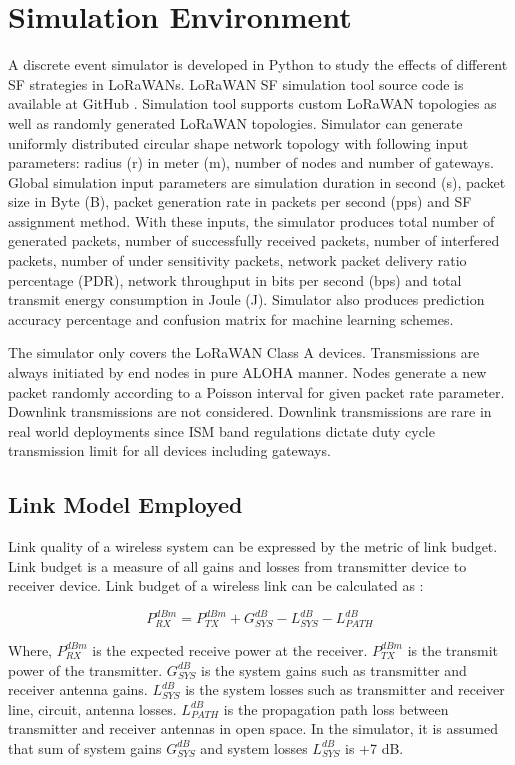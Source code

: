 \documentclass[conference]{IEEEtran}
\begin{document}
\section{Simulation Environment} \label{Simulation Environment}
A discrete event simulator is developed in Python to study the effects of different SF strategies in LoRaWANs. LoRaWAN SF simulation tool source code is available at GitHub \cite{simlorasf}. Simulation tool supports custom LoRaWAN topologies as well as randomly generated LoRaWAN topologies. Simulator can generate uniformly distributed circular shape network topology with following input parameters: radius (r) in meter (m), number of nodes and number of gateways. Global simulation input parameters are simulation duration in second (s), packet size in Byte (B), packet generation rate in packets per second (pps) and SF assignment method. With these inputs, the simulator produces total number of generated packets, number of successfully received packets, number of interfered packets, number of under sensitivity packets, network packet delivery ratio percentage (PDR), network throughput in bits per second (bps) and total transmit energy consumption in Joule (J). Simulator also produces prediction accuracy percentage and confusion matrix for machine learning schemes.

The simulator only covers the LoRaWAN Class A devices. Transmissions are always initiated by end nodes in pure ALOHA manner. Nodes generate a new packet randomly according to a Poisson interval for given packet rate parameter. Downlink transmissions are not considered. Downlink transmissions are rare in real world deployments since ISM band regulations dictate duty cycle transmission limit for all devices including gateways.

\subsection{Link Model Employed}
Link quality of a wireless system can be expressed by the metric of link budget. Link budget is a measure of all gains and losses from transmitter device to receiver device. Link budget of a wireless link can be calculated as \cite{AN1200.22}:

\begin{equation} \label{eq:expected_rx_power}
P^{dBm}_{RX} = P^{dBm}_{TX} + G^{dB}_{SYS} - L^{dB}_{SYS} - L^{dB}_{PATH}
\end{equation}

Where, $P^{dBm}_{RX}$ is the expected receive power at the receiver. $P^{dBm}_{TX}$ is the transmit power of the transmitter. $G^{dB}_{SYS}$ is the system gains such as transmitter and receiver antenna gains. $L^{dB}_{SYS}$ is the system losses such as transmitter and receiver line, circuit, antenna losses. $L^{dB}_{PATH}$ is the propagation path loss between transmitter and receiver antennas in open space. In the simulator, it is assumed that sum of system gains $G^{dB}_{SYS}$ and system losses $L^{dB}_{SYS}$ is +7 dB.
\end{document}
